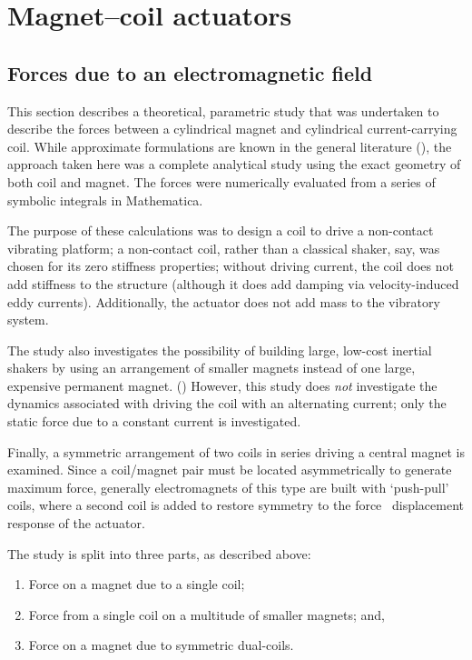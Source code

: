 \chapter{Magnet--coil actuators}

\section{Forces due to an electromagnetic field}

This section describes a theoretical, parametric study that was undertaken to
describe the forces between a cylindrical magnet and cylindrical
current-carrying coil. While approximate formulations are known in the general
literature (), the approach taken here was a complete
analytical study using the exact geometry of both coil and magnet. The
forces were numerically evaluated from a series of symbolic integrals in
Mathematica.

The purpose of these calculations was to design a coil to drive a non-contact
vibrating platform; a non-contact coil, rather than a classical shaker, say,
was chosen for its zero stiffness properties; without driving current, the
coil does not add stiffness to the structure (although it does add damping via
velocity-induced eddy currents). Additionally, the actuator does not add mass
to the vibratory system. 

The study also investigates the possibility of building large, low-cost
inertial shakers by using an arrangement of smaller magnets instead of one
large, expensive permanent magnet. () However, this study does \emph{not} investigate the dynamics
associated with driving the coil with an alternating current; only the static
force due to a constant current is investigated.


Finally, a symmetric arrangement of two coils in series driving a central
magnet is examined. Since a coil/magnet pair must be located asymmetrically to
generate maximum force, generally electromagnets of this type are built with
`push-pull' coils, where a second coil is added to restore symmetry to the
force \vs\  displacement response of the actuator.

The study is split into three parts, as described above:
\begin{enumerate}
\item Force on a magnet due to a single coil;
\item Force from a single coil on a multitude of smaller magnets; and,
\item Force on a magnet due to symmetric dual-coils.
\end{enumerate}

